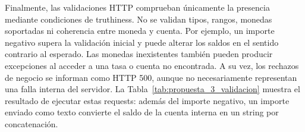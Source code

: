     \begin{code}
        
        \caption{Cálculo monetario con \texttt{Number} en \texttt{app/exchange.js}.}
        \label{lst:floats}
    \end{code}

    Finalmente, las validaciones HTTP comprueban únicamente la presencia mediante
    condiciones de truthiness. No se validan tipos, rangos, monedas soportadas ni
    coherencia entre moneda y cuenta. Por ejemplo, un importe negativo supera la
    validación inicial y puede alterar los saldos en el sentido contrario al esperado.
    Las monedas inexistentes también pueden producir excepciones al acceder a una tasa
    o cuenta no encontrada. A su vez, los rechazos de negocio se informan como HTTP 500,
    aunque no necesariamente representan una falla interna del servidor. La
    Tabla~\ref{tab:propuesta_3_validacion} muestra el resultado de ejecutar estas requests:
    además del importe negativo, un importe enviado como texto convierte el saldo de la
    cuenta interna en un string por concatenación.

    \begin{code}
        
        \caption{Validación por presencia en \texttt{app/app.js}.}
        \label{lst:request_validation}
    \end{code}

